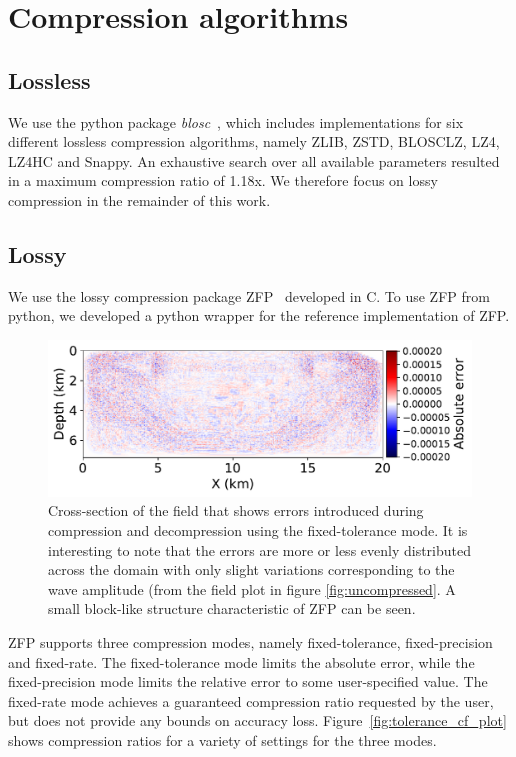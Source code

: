 \documentclass[conference]{IEEEtran}
\begin{document}
\section{Compression algorithms}
\subsection{Lossless}
We use the python package \emph{blosc}~\cite{blosc}, which includes implementations for
six different lossless compression algorithms, namely ZLIB, ZSTD, BLOSCLZ,
LZ4, LZ4HC and Snappy. An exhaustive search over all available parameters 
resulted in a maximum compression ratio of 1.18x. We therefore focus on lossy
compression in the remainder of this work.

\subsection{Lossy}
We use the lossy compression package ZFP~\cite{lindstrom2014fixed} developed in
C. To use ZFP from python, we developed a python wrapper for the reference
implementation of ZFP.

\begin{figure}
\begin{center}
\includegraphics[width=0.8\linewidth]{images/errors.pdf}
\end{center}
\caption{Cross-section of the field that shows errors introduced
  during compression and decompression using the fixed-tolerance
  mode. It is interesting to note that the errors are more or less
  evenly distributed across the domain with only slight variations
  corresponding to the wave amplitude (from the field plot in figure
  \ref{fig:uncompressed}. A small block-like structure characteristic of
  ZFP can be seen.}
\label{fig:decompressed_error}
\end{figure}

ZFP supports three compression modes, namely fixed-tolerance, fixed-precision
and fixed-rate. The fixed-tolerance mode limits the absolute error, while the
fixed-precision mode limits the relative error to some user-specified value.
The fixed-rate mode achieves a guaranteed compression ratio requested by the
user, but does not provide any bounds on accuracy loss.
Figure~\ref{fig:tolerance_cf_plot} shows compression ratios for a variety of
settings for the three modes.
\end{document}
